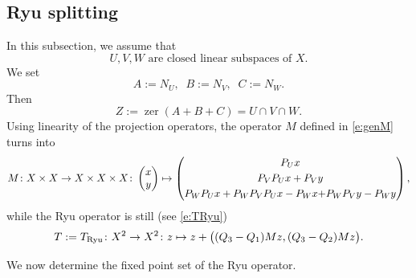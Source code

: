 \documentclass[11pt]{article}
\newcommand{\zer}{\ensuremath{\operatorname{zer}}}
\newcommand{\tryu}{\ensuremath{T_{\text{\scriptsize Ryu}}}}
\theoremstyle{definition}
\providecommand{\zer}{\operatorname{zer}}
\begin{document}
{\label{sec:main}

\subsection{Ryu splitting}

In this subsection, we assume that 
\begin{equation*}
\text{
$U,V,W$ are closed linear subspaces of $X$.
}
\end{equation*}
We set
\begin{equation*}
A := N_U,
\;\;
B := N_V,
\;\;
C := N_{W}. 
\end{equation*}
Then
\begin{equation*}
Z := \zer(A+B+C) = U\cap V\cap W.
\end{equation*}
Using linearity of the projection operators, the operator $M$ defined in \cref{e:genM} turns into
\begin{equation}
\label{e:linM}
M\colon X\times X\to X\times X\times X\colon
\begin{pmatrix}
x\\
y
\end{pmatrix}
\mapsto
\begin{pmatrix}
P_Ux\\[+1mm]
P_VP_Ux+P_Vy\\[+1mm]
P_WP_Ux + \textcolor{black}{P_W}P_VP_Ux-P_Wx \textcolor{black}{+}P_WP_Vy-P_Wy
\end{pmatrix},
\end{equation}
while the Ryu operator is still (see \cref{e:TRyu})
\begin{equation}
\label{e:linT}
T := \tryu \colon X^2\to X^2\colon 
z\mapsto 
z + \big((Q_3-Q_1)Mz,(Q_3-Q_2)Mz\big). 
\end{equation}

We now determine the fixed point set of the Ryu operator.

}
\end{document}
